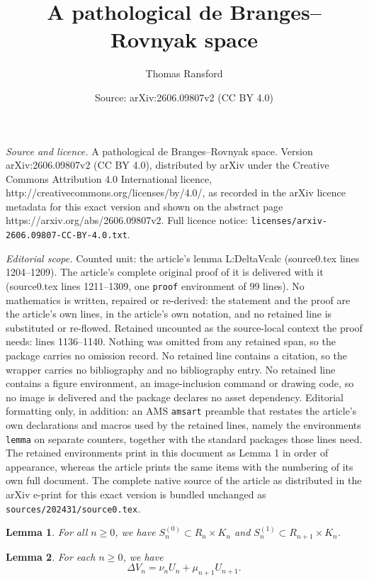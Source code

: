 \documentclass[10pt,a4paper]{amsart}
\title{A pathological de Branges--Rovnyak space}
\author{Thomas Ransford}
\date{Source: arXiv:2606.09807v2 (CC BY 4.0)}
\newtheorem{lemma}{Lemma}
\begin{document}
\maketitle

\noindent\emph{Source and licence.} A pathological de Branges--Rovnyak space. Version arXiv:2606.09807v2 (CC BY 4.0), distributed by arXiv under the Creative Commons Attribution 4.0 International licence, http://creativecommons.org/licenses/by/4.0/, as recorded in the arXiv licence metadata for this exact version and shown on the abstract page https://arxiv.org/abs/2606.09807v2. Full licence notice: \texttt{licenses/arxiv-2606.09807-CC-BY-4.0.txt}.\par\smallskip

\noindent\textit{Editorial scope.} Counted unit: the article's lemma L:DeltaVcalc (source0.tex lines 1204--1209). The article's complete original proof of it is delivered with it (source0.tex lines 1211--1309, one \texttt{proof} environment of 99 lines). No mathematics is written, repaired or re-derived: the statement and the proof are the article's own lines, in the article's own notation, and no retained line is substituted or re-flowed.  Retained uncounted as the source-local context the proof needs: lines 1136--1140.  Nothing was omitted from any retained span, so the package carries no omission record.  No retained line contains a citation, so the wrapper carries no bibliography and no bibliography entry.  No retained line contains a figure environment, an image-inclusion command or drawing code, so no image is delivered and the package declares no asset dependency.  Editorial formatting only, in addition: an AMS \texttt{amsart} preamble that restates the article's own declarations and macros used by the retained lines, namely the environments \texttt{lemma} on separate counters, together with the standard packages those lines need.  The retained environments print in this document as Lemma 1 in order of appearance, whereas the article prints the same items with the numbering of its own full document.  The complete native source of the article as distributed in the arXiv e-print for this exact version is bundled unchanged as \texttt{sources/202431/source0.tex}.
\begin{lemma}\label{L:saturation}
For all $n\ge0$, we have
$S_n^{(0)}\subset R_n\times K_n$
and $S_n^{(1)}\subset R_{n+1}\times K_n$.
\end{lemma}

\begin{lemma}\label{L:DeltaVcalc}
For each $n\ge0$, we have
\[
\Delta V_n=\nu_n U_n+\mu_{n+1}U_{n+1}.
\]
\end{lemma}
\end{document}

